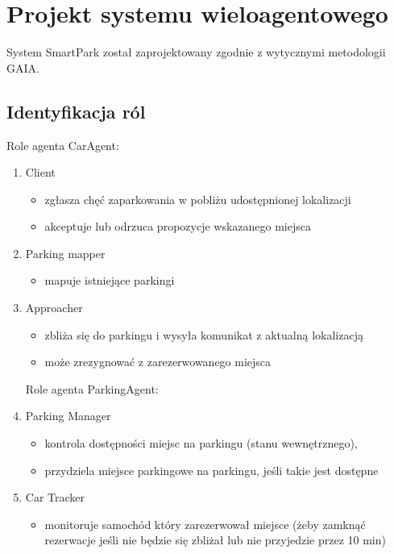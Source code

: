 \newpage
\section{Projekt systemu wieloagentowego}

System SmartPark został zaprojektowany zgodnie z wytycznymi metodologii GAIA.

\subsection{Identyfikacja ról}
Role agenta CarAgent:
\begin{enumerate}

\item Client 
\begin{itemize}
    \item zgłasza chęć zaparkowania w pobliżu udostępnionej lokalizacji
    \item akceptuje lub odrzuca propozycje wskazanego miejsca 
\end{itemize}
 
\item Parking mapper
\begin{itemize}
    \item mapuje istniejące parkingi
\end{itemize}
\item Approacher
\begin{itemize}
    \item zbliża się do parkingu i wysyła komunikat z aktualną lokalizacją
    \item może zrezygnować z zarezerwowanego miejsca
\end{itemize}
Role agenta ParkingAgent: 
\item Parking Manager
\begin{itemize}
    \item kontrola dostępności miejsc na parkingu (stanu wewnętrznego),
\item przydziela miejsce parkingowe na parkingu, jeśli takie jest dostępne
\end{itemize}
\item Car Tracker 
\begin{itemize}
    \item monitoruje samochód który zarezerwował miejsce (żeby zamknąć rezerwacje jeśli
 nie będzie się zbliżał lub nie przyjedzie przez 10 min)
\end{itemize}
\end{enumerate}




